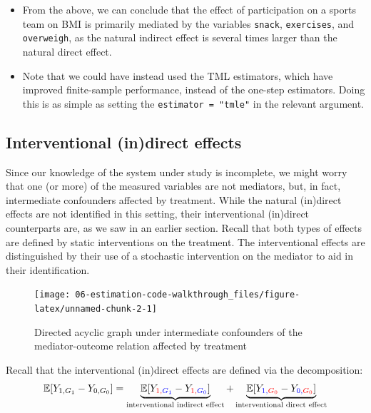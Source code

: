 \documentclass[
  12pt,
]{book}
\newcommand{\passthrough}[1]{#1}
\providecommand{\tightlist}{%
  \setlength{\itemsep}{0pt}\setlength{\parskip}{0pt}}
\theoremstyle{definition}
\theoremstyle{definition}
\theoremstyle{definition}
\newcommand{\E}{\mathbb{E}}
\newcommand{\1}{\mathbbm{1}}
\begin{document}
\begin{itemize}
\tightlist
\item
  From the above, we can conclude that the effect of participation on a sports
  team on BMI is primarily mediated by the variables \passthrough{\lstinline!snack!}, \passthrough{\lstinline!exercises!}, and
  \passthrough{\lstinline!overweigh!}, as the natural indirect effect is several times larger than the
  natural direct effect.
\item
  Note that we could have instead used the TML estimators, which have improved
  finite-sample performance, instead of the one-step estimators. Doing this is
  as simple as setting the \passthrough{\lstinline!estimator = "tmle"!} in the relevant argument.
\end{itemize}

\hypertarget{interventional-indirect-effects-1}{%
\subsection{Interventional (in)direct effects}\label{interventional-indirect-effects-1}}

Since our knowledge of the system under study is incomplete, we might worry that
one (or more) of the measured variables are not mediators, but, in fact,
intermediate confounders affected by treatment. While the natural (in)direct
effects are not identified in this setting, their interventional (in)direct
counterparts are, as we saw in an earlier section. Recall that both types of
effects are defined by static interventions on the treatment. The interventional
effects are distinguished by their use of a stochastic intervention on the
mediator to aid in their identification.

\begin{figure}
  
  {\centering \texttt{[image: 06-estimation-code-walkthrough\_files/figure-latex/unnamed-chunk-2-1]} 
  
  }
  
  \caption{Directed acyclic graph under intermediate confounders of the mediator-outcome relation affected by treatment}\label{fig:unnamed-chunk-2}
  \end{figure}

Recall that the interventional (in)direct effects are defined via the decomposition:
\begin{equation*}
\E[Y_{1,G_1} - Y_{0,G_0}] = \underbrace{\E[Y_{\color{red}{1},\color{blue}{G_1}} -
    Y_{\color{red}{1},\color{blue}{G_0}}]}_{\text{interventional indirect effect}} +
    \underbrace{\E[Y_{\color{blue}{1},\color{red}{G_0}} -
    Y_{\color{blue}{0},\color{red}{G_0}}]}_{\text{interventional direct effect}}
\end{equation*}
\end{document}
